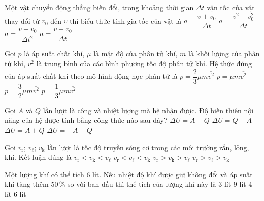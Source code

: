 	\begin{ex}%
		Một vật chuyển động thẳng biến đổi, trong khoảng thời gian $\Delta t$ vận tốc của vật thay đổi từ $v_0$ đến $v$ thì biểu thức tính gia tốc của vật là
		\choice
		{$a=\dfrac{v+v_0}{\Delta t}$}
		{$a=\dfrac{v^2-v_0^2}{\Delta t}$}
		{$a=\dfrac{v-v_0}{\Delta t^2}$}
		{\True $a=\dfrac{v-v_0}{\Delta t}$}
	\end{ex}

	\begin{ex}%
		Gọi $p$ là áp suất chất khí, $\mu$ là mật độ của phân tử khí, $m$ là khối lượng của phân tử khí, $\overline{v^2}$ là trung bình của các bình phương tốc độ phân tử khí. Hệ thức đúng của áp suất chất khí theo mô hình động học phân tử là
		\choice
		{$p=\dfrac{2}{3}\mu m\overline{v^2}$}
		{$p=\mu m\overline{v^2}$}
		{$p=\dfrac{3}{2}\mu m\overline{v^2}$}
		{\True $p=\dfrac{1}{3}\mu m\overline{v^2}$}
	\end{ex}

	\begin{ex}%
		Gọi $A$ và $Q$ lần lượt là công và nhiệt lượng mà hệ nhận được. Độ biến thiên nội năng của hệ được tính bằng công thức nào sau đây?
		\choice
		{$\Delta U=A-Q$}
		{$\Delta U=Q-A$}
		{\True $\Delta U=A+Q$}
		{$\Delta U=-A-Q$}
	\end{ex}

	\begin{ex}%
		Gọi $v_\text{r}$; $v_\ell$; $v_\text{k}$ lần lượt là tốc độ truyền sóng cơ trong các môi trường rắn, lỏng, khí. Kết luận đúng là
		\choice
		{$v_\text{r}<v_\text{k}<v_\ell$}
		{$v_\text{r}<v_\ell<v_\text{k}$}
		{$v_\text{r}>v_\text{k}>v_\ell$}
		{\True $v_\text{r}>v_\ell>v_\text{k}$}
	\end{ex}

	\begin{ex}%
		Một lượng khí có thể tích $6$ lít. Nếu nhiệt độ khí được giữ không đổi và áp suất khí tăng thêm $50\,\%$ so với ban đầu thì thể tích của lượng khí này là
		\choice
		{$3$ lít}
		{$9$ lít}
		{\True $4$ lít}
		{$6$ lít}
	\end{ex}

